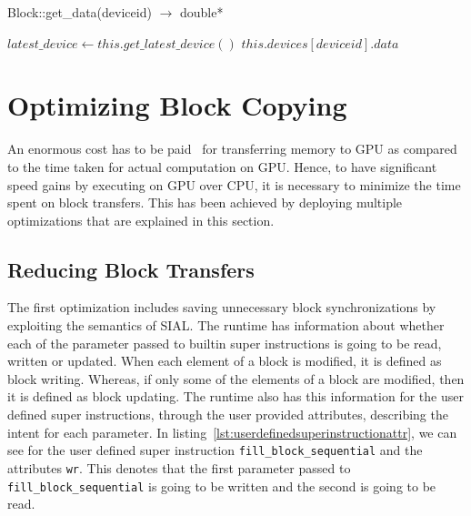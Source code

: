 \begin{algorithm}  {Block::get\_data(deviceid) $\rightarrow$ double*}
  \singlespacing

  \begin{algorithmic}[1]
    \State $latest\_device \gets this.get\_latest\_device()$
    \EndIf
    \State \Return $this.devices[deviceid].data$
    \EndFunction
  \end{algorithmic}
  \label{alg:get_data}
\end{algorithm}

\section{Optimizing Block Copying}
An enormous cost has to be paid~\cite{Bakkum2010, memorytransferoverhead}
for transferring memory to GPU as compared to the time taken for actual computation
on GPU. Hence, to have significant speed gains by executing on GPU over CPU,
it is necessary to minimize the time spent on block transfers. This has been
achieved by deploying multiple optimizations that are explained in this section.

\subsection{Reducing Block Transfers}
The first optimization includes saving unnecessary block synchronizations by
exploiting the semantics of SIAL. The runtime has information about whether each of
the parameter passed to builtin super instructions is going to be read, written or updated.
When each element of a block is modified, it is defined as block writing. Whereas,
if only some of the elements of a block are modified, then it is defined as block updating.
The runtime also has this information for the user defined super instructions, through
the user provided attributes, describing the intent for each parameter.
In listing~\ref{lst:userdefinedsuperinstructionattr}, we can see for the user
defined super instruction \texttt{fill\_block\_sequential} and the attributes \texttt{wr}.
This denotes that the first parameter passed to \texttt{fill\_block\_sequential}
is going to be written and the second is going to be read.

